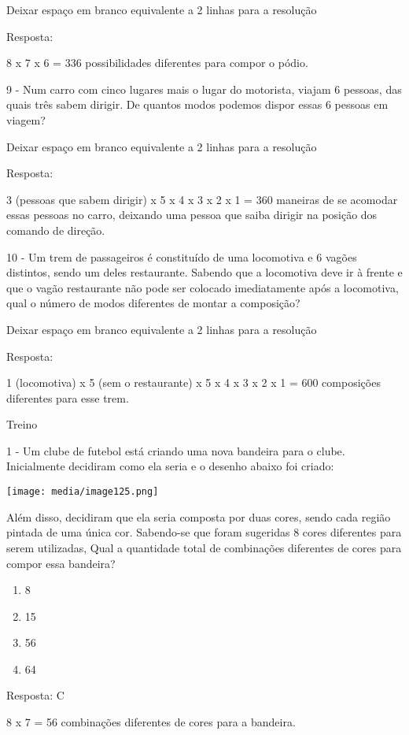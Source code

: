 Deixar espaço em branco equivalente a 2 linhas para a resolução

Resposta:

8 x 7 x 6 = 336 possibilidades diferentes para compor o pódio.

9 - Num carro com cinco lugares mais o lugar do motorista, viajam 6
pessoas, das quais três sabem dirigir. De quantos modos podemos dispor
essas 6 pessoas em viagem?

Deixar espaço em branco equivalente a 2 linhas para a resolução

Resposta:

3 (pessoas que sabem dirigir) x 5 x 4 x 3 x 2 x 1 = 360 maneiras de se
acomodar essas pessoas no carro, deixando uma pessoa que saiba dirigir
na posição dos comando de direção.

10 - Um trem de passageiros é constituído de uma locomotiva e 6 vagões
distintos, sendo um deles restaurante. Sabendo que a locomotiva deve ir
à frente e que o vagão restaurante não pode ser colocado imediatamente
após a locomotiva, qual o número de modos diferentes de montar a
composição?

Deixar espaço em branco equivalente a 2 linhas para a resolução

Resposta:

1 (locomotiva) x 5 (sem o restaurante) x 5 x 4 x 3 x 2 x 1 = 600
composições diferentes para esse trem.

Treino

1 - Um clube de futebol está criando uma nova bandeira para o clube.
Inicialmente decidiram como ela seria e o desenho abaixo foi criado:

\texttt{[image: media/image125.png]}

Além disso, decidiram que ela seria composta por duas cores, sendo cada
região pintada de uma única cor. Sabendo-se que foram sugeridas 8 cores
diferentes para serem utilizadas, Qual a quantidade total de combinações
diferentes de cores para compor essa bandeira?

\begin{enumerate}
\def\labelenumi{\alph{enumi})}
\item
  8
\item
  15
\item
  56
\item
  64
\end{enumerate}

Resposta: C

8 x 7 = 56 combinações diferentes de cores para a bandeira.

